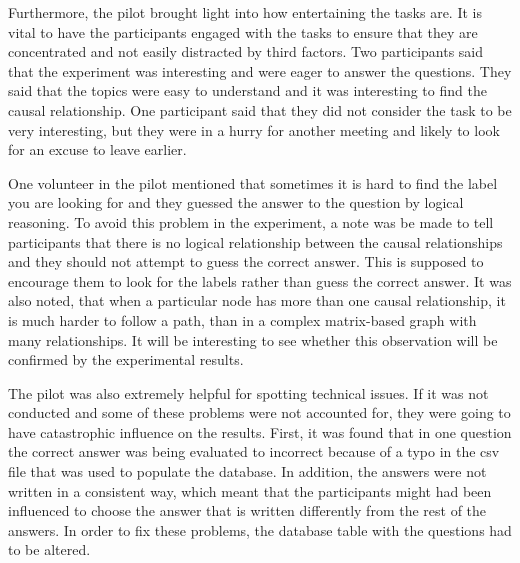 \documentclass{l4proj}
\begin{document}
Furthermore, the pilot brought light into how entertaining the tasks are. It is vital to have the participants engaged with the tasks to ensure that they are concentrated and not easily distracted by third factors. Two participants said that the experiment was interesting and were eager to answer the questions. They said that the topics were easy to understand and it was interesting to find the causal relationship. One participant said that they did not consider the task to be very interesting, but they were in a hurry for another meeting and likely to look for an excuse to leave earlier.  

One volunteer in the pilot mentioned that sometimes it is hard to find the label you are looking for and they guessed the answer to the question by logical reasoning. To avoid this problem in the experiment, a note was be made to tell participants that there is no logical relationship between the causal relationships and they should not attempt to guess the correct answer. This is supposed to encourage them to look for the labels rather than guess the correct answer. It was also noted, that when a particular node has more than one causal relationship, it is much harder to follow a path, than in a complex matrix-based graph with many relationships. It will be interesting to see whether this observation will be confirmed by the experimental results.

The pilot was also extremely helpful for spotting technical issues. If it was not conducted and some of these problems were not accounted for, they were going to have catastrophic influence on the results. First, it was found that in one question the correct answer was being evaluated to incorrect because of a typo in the csv file that was used to populate the database. In addition, the answers were not written in a consistent way, which meant that the participants might had been influenced to choose the answer that is written differently from the rest of the answers. In order to fix these problems, the database table with the questions had to be altered. 
\end{document}
